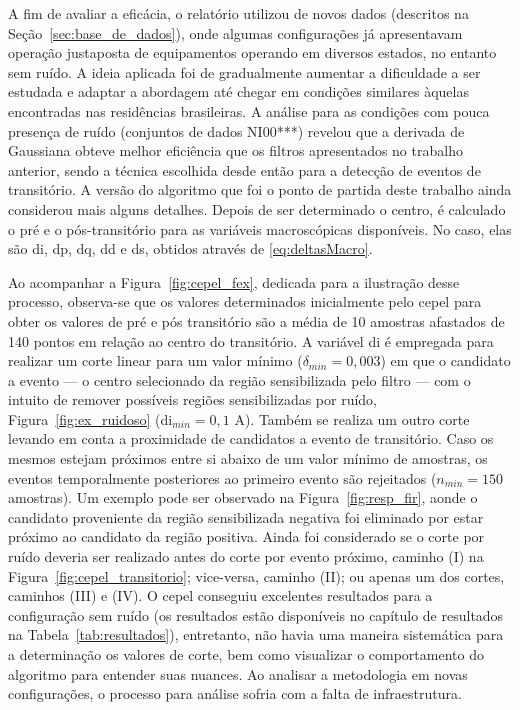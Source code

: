 \FloatBarrier

A fim de avaliar a eficácia, o relatório utilizou de novos dados
(descritos na Seção~\ref{sec:base_de_dados}), onde
algumas configurações já apresentavam operação justaposta de equipamentos
operando em diversos estados, no entanto sem ruído. A ideia aplicada
foi de gradualmente aumentar a dificuldade a ser estudada e adaptar a
abordagem até chegar em condições similares àquelas encontradas nas
residências brasileiras. A análise para as condições com pouca
presença de ruído (conjuntos de dados NI00***) revelou
que a derivada de Gaussiana obteve melhor eficiência que os filtros
apresentados no trabalho anterior, sendo a técnica escolhida desde
então para a detecção de eventos de transitório.  A versão do
algoritmo que foi o ponto de partida deste trabalho ainda considerou
mais alguns detalhes. Depois de ser determinado o centro, é calculado
o pré e o pós-transitório para as variáveis macroscópicas disponíveis.
No caso, elas são \acf{di}, \acf{dp}, \acf{dq}, \acf{dd} e \acf{ds},
obtidos através de \ref{eq:deltasMacro}.

Ao acompanhar a Figura~\ref{fig:cepel_fex}, dedicada para a ilustração
desse processo, observa-se que os valores determinados inicialmente
pelo \gls{cepel} para obter os valores de pré e pós transitório são a
média de 10 amostras afastados de 140 pontos em relação ao centro do
transitório. A variável \acs{di} é empregada para realizar um corte
linear para um valor mínimo ($\delta_{min} = 0,003$) em que o
candidato a evento --- o centro selecionado da região sensibilizada
pelo filtro --- com o intuito de remover possíveis regiões
sensibilizadas por ruído, Figura~\ref{fig:ex_ruidoso} (\acs{di}$_{min}
= 0,1$ A). Também se realiza um outro corte levando em conta a
proximidade de candidatos a evento de transitório. Caso os mesmos
estejam próximos entre si abaixo de um valor mínimo de amostras, os
eventos temporalmente posteriores ao primeiro evento são rejeitados
($n_{min} = 150$ amostras). Um exemplo pode ser observado na
Figura~\ref{fig:resp_fir}, aonde o candidato proveniente da região
sensibilizada negativa foi eliminado por estar próximo ao candidato da
região positiva. Ainda foi considerado se o corte por ruído deveria
ser realizado antes do corte por evento próximo, caminho (I) na
Figura~\ref{fig:cepel_transitorio}; vice-versa, caminho (II); ou
apenas um dos cortes, caminhos (III) e (IV). O \gls{cepel} conseguiu
excelentes resultados para a configuração sem ruído (os resultados
estão disponíveis no capítulo de resultados na
Tabela~\ref{tab:resultados}), entretanto, não havia uma maneira
sistemática para a determinação os valores de corte, bem como
visualizar o comportamento do algoritmo para entender suas nuances. Ao
analisar a metodologia em novas configurações, o processo para análise
sofria com a falta de infraestrutura.

